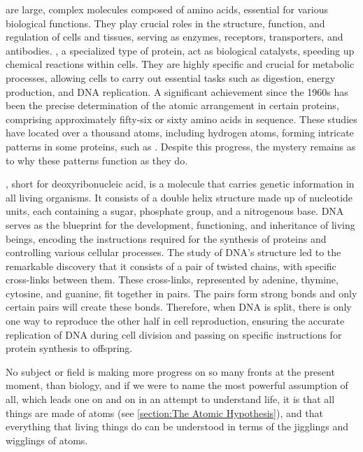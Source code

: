  are large, complex molecules composed of amino acids, essential for various biological functions. They play crucial roles in the structure, function, and regulation of cells and tissues, serving as enzymes, receptors, transporters, and antibodies. , a specialized type of protein, act as biological catalysts, speeding up chemical reactions within cells. They are highly specific and crucial for metabolic processes, allowing cells to carry out essential tasks such as digestion, energy production, and DNA replication. A significant achievement since the 1960s has been the precise determination of the atomic arrangement in certain proteins, comprising approximately fifty-six or sixty amino acids in sequence. These studies have located over a thousand atoms, including hydrogen atoms, forming intricate patterns in some proteins, such as . Despite this progress, the mystery remains as to why these patterns function as they do.

, short for deoxyribonucleic acid, is a molecule that carries genetic information in all living organisms. It consists of a double helix structure made up of nucleotide units, each containing a sugar, phosphate group, and a nitrogenous base. DNA serves as the blueprint for the development, functioning, and inheritance of living beings, encoding the instructions required for the synthesis of proteins and controlling various cellular processes. The study of DNA's structure led to the remarkable discovery that it consists of a pair of twisted chains, with specific cross-links between them. These cross-links, represented by adenine, thymine, cytosine, and guanine, fit together in pairs. The pairs form strong bonds and only certain pairs will create these bonds. Therefore, when DNA is split, there is only one way to reproduce the other half in cell reproduction, ensuring the accurate replication of DNA during cell division and passing on specific instructions for protein synthesis to offspring.

No subject or field is making more progress on so many fronts at the present moment, than biology, and if we were to name the most powerful assumption of all, which leads one on and on in an attempt to understand life, it is that all things are made of atoms (see \ref{section:The Atomic Hypothesis}), and that everything that living things do can be understood in terms of the jigglings and wigglings of atoms.






